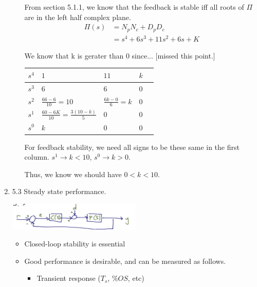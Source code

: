 \begin{enumerate}
\begin{enumerate}
                    From section 5.1.1, we know that the feedback is stable iff all roots of $\Pi$ are in the left half complex plane.
                    \begin{align*}
                        \Pi(s) &= N_p N_c + D_p D_c \\
                        &= s^4 + 6s^3 + 11s^2 + 6s + K
                    \end{align*}

                    We know that k is gerater than 0 since... [missed this point.]

                    \begin{table}[h]
                        \centering
                        \begin{tabular}{ | l || l | l | l | l | }
                            \hline
                            \hline
                            $s^4$ & $1$ & $11$ & $k$ \\ \hline
                            $s^3$ & $6$ & $6$ & $0$ \\ \hline
                            $s^2$ & $\frac{66-6}{10} = 10$ & $\frac{6k - 0}{6} = k$ & $0$ \\ \hline
                            $s^1$ & $\frac{60-6K}{10} = \frac{3(10-k)}{5}$ & $0$& $0$\\ \hline
                            $s^0$ & $k$ & $0$& $0$\\ \hline
                        \end{tabular}
                    \end{table}

                    For feedback stability, we need all signs to be these same in the first column. $s^1 \to k < 10$, $s^0 \to k > 0$.

                    Thus, we know we should have $0 < k < 10$.
            \end{enumerate}

        \item 5.3 Steady state performance.

            \begin{center}\includegraphics[width=0.5\textwidth,keepaspectratio]{images/5-7.png}\end{center}
            \begin{itemize}
                \item Closed-loop stability is essential
                \item Good performance is desirable, and can be measured as follows.
                    \begin{itemize}
                        \item Transient response ($T_s$, $\% OS$, etc)


\end{itemize}
\end{itemize}
\end{enumerate}
